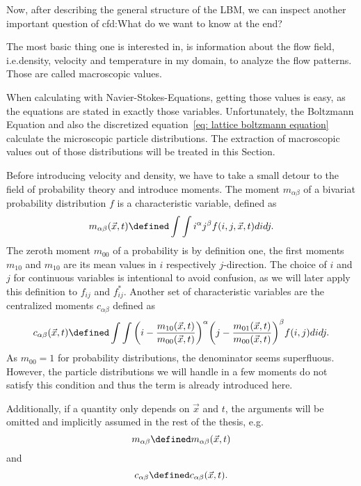 Now, after describing the general structure of the LBM, we can inspect another important question of \gls{cfd}:\@ What do we want to know at the end?

The most basic thing one is interested in, is information about the flow field, i.e.\@ density, velocity and temperature in my domain, to analyze the flow patterns.
Those are called macroscopic values.

When calculating with Navier-Stokes-Equations, getting those values is easy, as the equations are stated in exactly those variables.
Unfortunately, the Boltzmann Equation and also the discretized equation~\eqref{eq: lattice boltzmann equation} calculate the microscopic particle distributions. The extraction of macroscopic values out of those distributions will be treated in this Section.

Before introducing velocity and density, we have to take a small detour to the field of probability theory and introduce moments. The moment $m_{\alpha\beta}$ of a bivariat probability distribution $f$ is a characteristic variable, defined as
\begin{equation}
  m_{\alpha\beta}(\vec{x},t) \defined \int\int i^\alpha j^\beta f(i,j,\vec{x},t) didj.
\end{equation}
The zeroth moment $m_{00}$ of a probability is by definition one, the first moments $m_{10}$ and $m_{10}$ are its mean values in $i$ respectively $j$-direction.
The choice of $i$ and $j$ for continuous variables is intentional to avoid confusion, as we will later apply this definition to $f_{ij}$ and $f_{ij}^*$.
Another set of characteristic variables are the centralized moments $c_{\alpha\beta}$ defined as
\begin{equation}
  c_{\alpha\beta}(\vec{x},t) \defined \int\int {\left(i - \frac{m_{10}(\vec{x},t)}{m_{00}(\vec{x},t)}\right)}^\alpha {\left(j-\frac{m_{01}(\vec{x},t)}{m_{00}(\vec{x},t)}\right)}^\beta f(i,j) didj.
\end{equation}
As $m_{00}=1$ for probability distributions, the denominator seems superfluous. However, the particle distributions we will handle in a few moments do not satisfy this condition and thus the term is already introduced here.

Additionally, if a quantity only depends on $\vec{x}$ and $t$, the arguments will be omitted and implicitly assumed in the rest of the thesis, e.g.
\begin{equation}
    m_{\alpha\beta} \defined m_{\alpha\beta}(\vec{x},t)
\end{equation}
and
\begin{equation}
    c_{\alpha\beta} \defined c_{\alpha\beta}(\vec{x},t).
\end{equation}

